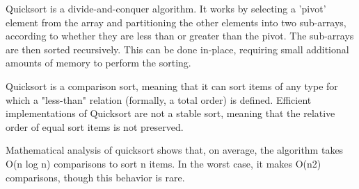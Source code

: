 Quicksort is a divide-and-conquer algorithm. It works by selecting a 'pivot' element from the array and partitioning the other elements into two sub-arrays, according to whether they are less than or greater than the pivot. The sub-arrays are then sorted recursively. This can be done in-place, requiring small additional amounts of memory to perform the sorting.

Quicksort is a comparison sort, meaning that it can sort items of any type for which a "less-than" relation (formally, a total order) is defined. Efficient implementations of Quicksort are not a stable sort, meaning that the relative order of equal sort items is not preserved.

Mathematical analysis of quicksort shows that, on average, the algorithm takes O(n log n) comparisons to sort n items. In the worst case, it makes O(n2) comparisons, though this behavior is rare.

